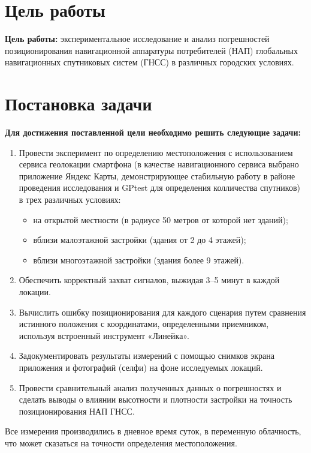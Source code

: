 \section{Цель работы}
\textbf{Цель работы:} экспериментальное исследование и анализ погрешностей позиционирования навигационной аппаратуры потребителей (НАП) глобальных навигационных спутниковых систем (ГНСС) в различных городских условиях.

\section{Постановка задачи}
\textbf{Для достижения поставленной цели необходимо решить следующие задачи:}
\begin{enumerate}
    \item Провести эксперимент по определению местоположения с использованием сервиса геолокации смартфона (в качестве навигационного сервиса выбрано приложение Яндекс Карты, демонстрирующее стабильную работу в районе проведения исследования и GPtest для определения колличества спутников) в трех различных условиях:
    \begin{itemize}
        \item на открытой местности (в радиусе 50 метров от которой нет зданий);
        \item вблизи малоэтажной застройки (здания от 2 до 4 этажей);
        \item вблизи многоэтажной застройки (здания более 9 этажей).
    \end{itemize}
    \item Обеспечить корректный захват сигналов, выжидая 3--5 минут в каждой локации.
    \item Вычислить ошибку позиционирования для каждого сценария путем сравнения истинного положения с координатами, определенными приемником, используя встроенный инструмент «Линейка».
    \item Задокументировать результаты измерений с помощью снимков экрана приложения и фотографий (селфи) на фоне исследуемых локаций.
    \item Провести сравнительный анализ полученных данных о погрешностях и сделать выводы о влиянии высотности и плотности застройки на точность позиционирования НАП ГНСС.
\end{enumerate}

Все измерения производились в дневное время суток, в переменную облачность, что может сказаться на точности определения местоположения.